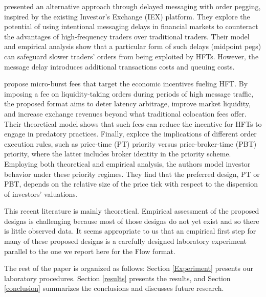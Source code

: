 \cite{Aldrich2022} presented an alternative approach through delayed messaging with order pegging, inspired by the existing Investor’s Exchange (IEX) platform. They explore the potential of using intentional messaging delays in financial markets to counteract the advantages of high-frequency traders over traditional traders. Their model and empirical analysis show that a particular form of such delays (midpoint pegs) can safeguard slower traders' orders from being exploited by HFTs. However, the message delay introduces additional transactions costs and queuing costs. 

\cite{brolley2023} propose micro-burst fees that target the economic incentives fueling HFT. By imposing a fee on liquidity-taking orders during periods of high message traffic, the proposed format aims to deter latency arbitrage, improve market liquidity, and increase exchange revenues beyond what traditional colocation fees offer. Their theoretical model shows that such fees can reduce the incentive for HFTs to engage in predatory practices.  Finally,  \cite{Degryse2022} explore the implications of different order execution rules, such as price-time (PT) priority versus price-broker-time (PBT) priority, where the latter includes broker identity in the priority scheme. Employing both theoretical and empirical analysis, the authors model investor behavior under these priority regimes. They find that the preferred design, PT or PBT, depends on the relative size of the price tick with respect to the dispersion of investors' valuations. 

This recent literature is mainly theoretical. 
Empirical assessment of the proposed designs is challenging because most of those designs do not yet exist and so there is little observed data. It seems appropriate to us that an empirical first step for many of these proposed designs is a carefully designed laboratory experiment parallel to the one we report here for the Flow format. 

The rest of the paper is organized as follows: Section \ref{Experiment} presents our laboratory procedures. Section \ref{results} presents the results, and Section \ref{conclusion} summarizes the conclusions and discusses future research. 



